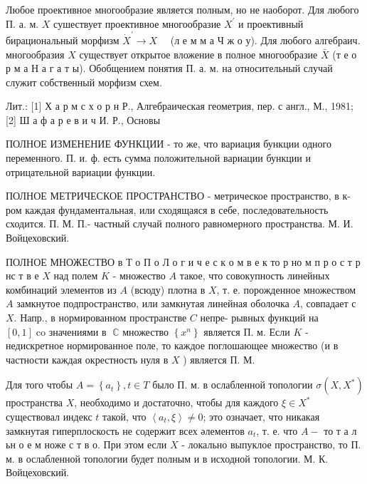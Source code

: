 \documentclass[10pt]{article}
\begin{document}
Любое проективное многообразие является полным, но не наоборот. Для любого П. а. м. $X$ сушествует проективное многообразие $X^{\prime}$ и проективный бирациональный морфизм $\dot{X}^{\prime} \rightarrow X \quad$ (л е м м а Ч ж о у). Для любого алгебраич. многообразия $X$ существует открытое вложение в полное многообразие $\bar{X}$ (т е о р м а Н а г а т ы). Обобщением понятия П. а. м. на относительный случай служит собственный морфизм схем.



Лит.: [1] Х а р м с х о р н Р., Алгебраическая геометрия, пер. с англ., М., 1981; [2] Ш а ф а р е в и ч И. Р., Основы



ПОЛНОЕ ИЗМЕНЕНИЕ ФУНКЦИИ - то же, что вариация бункции одного переменного. П. и. ф. есть сумма положительной вариации бункции и отрицательной вариации функции.



ПОЛНОЕ МЕТРИЧЕСКОЕ ПРОСТРАНСТВО - метрическое пространство, в к-ром каждая фундаментальная, или сходящаяся в себе, последовательность сходится. П. М. П.- частный случай полного равномерного пространства. М. И. Войцеховский.



ПОЛНОЕ МНОЖЕСТВО в Т о П о Л $о$ г и ч $е$ с к о м в е к то р но м п р о с т р нс т в е $X$ над полем $K$ - множество $A$ такое, что совокупность линейных комбинаций элементов из $A$ (всюду) плотна в $X$, т. е. порожденное множеством $A$ замкнутое подпространство, или замкнутая линейная оболочка $A$, совпадает с $X$. Напр., в нормированном пространстве $C$ непре- рывных функций на $[0,1] \operatorname{co~значениями~в~} \mathbb{C}$ множество $\left\{x^{n}\right\}$ является П. м. Если $K$ - недискретное нормированное поле, то каждое поглошающее множество (и в частности каждая окрестность нуля в $X$ ) является П. М.



Для того чтобы $A=\left\{a_{t}\right\}, t \in T$ было П. м. в ослабленной топологии $\sigma\left(X, X^{*}\right)$ пространства $X$, необходимо и достаточно, чтобы для каждого $\xi \in X^{*}$ существовал индекс $t$ такой, что $\left\langle a_{t}, \xi\right\rangle \neq 0$; это означает, что никакая замкнутая гиперплоскость не содержит всех әлементов $a_{t}$, т. е. что $A-$ то т а л ьн о е м ноже с т в о. При этом если $X$ - локально выпуклое пространство, то П. м. в ослабленной топологии будет полным и в исходной топологии. М. К. Войцеховский.
\end{document}
